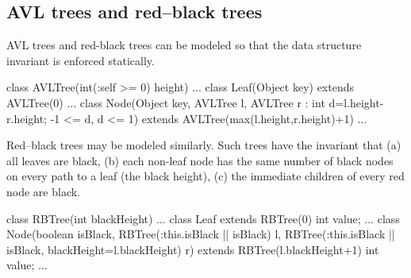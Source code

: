 \subsection{AVL trees and red--black trees}

AVL trees and red-black trees can be modeled so that the
data structure invariant is enforced statically.

\begin{displayxten}
class AVLTree(int(:self >= 0) height) {...}
class Leaf(Object key) extends AVLTree(0) {...}
class Node(Object key, AVLTree l, AVLTree r
         : int d=l.height-r.height; -1 <= d, d <= 1) 
    extends AVLTree(max(l.height,r.height)+1) {...}
\end{displayxten}

Red--black trees may be modeled similarly. Such trees have the
invariant that (a) all leaves are black, (b) each non-leaf node has
the same number of black nodes on every path to a leaf (the black
height), (c) the immediate children of every red node are black.
\begin{displayxten}
class RBTree(int blackHeight) {...}
class Leaf extends RBTree(0) { int value; ... }
class Node(boolean isBlack, 
           RBTree(:this.isBlack || isBlack) l, 
           RBTree(:this.isBlack || isBlack,
                   blackHeight=l.blackHeight) r)
    extends RBTree(l.blackHeight+1) { int value; ... }
\end{displayxten}

